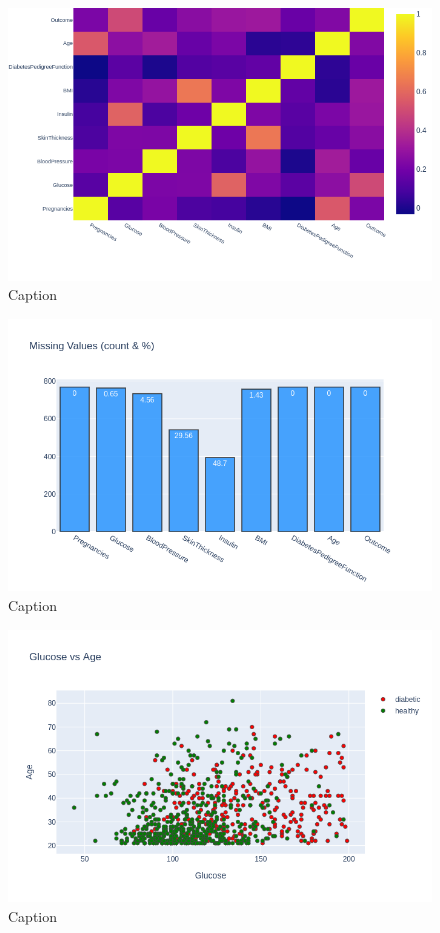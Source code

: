 \documentclass[12pt]{article}
\begin{document}
\begin{figure}[ht]
\centering
\includegraphics[width=1\textwidth]{4a.png}
\caption{\label{fig:11} Caption}
\end{figure}

\begin{figure}[ht]
\centering
\includegraphics[width=1\textwidth]{4.png}
\caption{\label{fig:12} Caption}
\end{figure}

\begin{figure}[ht]
\centering
\includegraphics[width=1\textwidth]{5.png}
\caption{\label{fig:13} Caption}
\end{figure}
\end{document}
